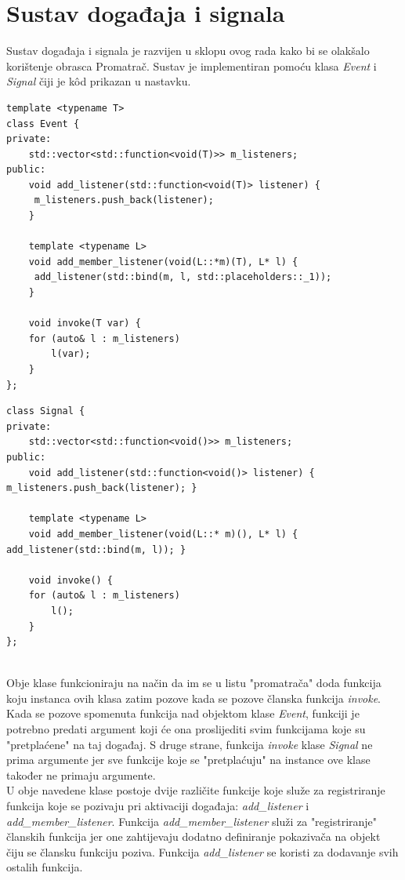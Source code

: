 \documentclass[times, utf8, diplomski]{fer}
\begin{document}
\chapter{Sustav događaja i signala} \label{appendix:event-signal-system}

Sustav događaja i signala je razvijen u sklopu ovog rada kako bi se olakšalo korištenje obrasca Promatrač. Sustav je implementiran pomoću klasa \textit{Event} i  \textit{Signal} čiji je k\^{o}d prikazan u nastavku.\\

\begin{lstlisting}[caption={Klasa \textit{Event}},captionpos=b]
template <typename T>
class Event {
private:
	std::vector<std::function<void(T)>> m_listeners;
public:
	void add_listener(std::function<void(T)> listener) {
	 m_listeners.push_back(listener); 
	}
	
	template <typename L>
	void add_member_listener(void(L::*m)(T), L* l) {
	 add_listener(std::bind(m, l, std::placeholders::_1)); 
	}
	
	void invoke(T var) {
	for (auto& l : m_listeners)
		l(var);
	}
};
\end{lstlisting}

\begin{lstlisting}[caption={Klasa \textit{Signal}},captionpos=b]
class Signal {
private:
	std::vector<std::function<void()>> m_listeners;
public:
	void add_listener(std::function<void()> listener) { m_listeners.push_back(listener); }

	template <typename L>
	void add_member_listener(void(L::* m)(), L* l) { add_listener(std::bind(m, l)); }

	void invoke() {
	for (auto& l : m_listeners)
		l();
	}
};
\end{lstlisting}
\
\\

Obje klase funkcioniraju na način da im se u listu "promatrača" doda funkcija koju instanca ovih klasa zatim pozove kada se pozove članska funkcija \textit{invoke}. Kada se pozove spomenuta funkcija nad objektom klase \textit{Event}, funkciji je potrebno predati argument koji će ona proslijediti svim funkcijama koje su "pretplaćene" na taj događaj. S druge strane, funkcija \textit{invoke} klase \textit{Signal} ne prima argumente jer sve funkcije koje se "pretplaćuju" na instance ove klase također ne primaju argumente.\\

U obje navedene klase postoje dvije različite funkcije koje služe za registriranje funkcija koje se pozivaju pri aktivaciji događaja: \textit{add\_listener} i \textit{add\_member\_listener}. Funkcija \textit{add\_member\_listener} služi za "registriranje" članskih funkcija jer one zahtijevaju dodatno definiranje pokazivača na objekt čiju se člansku funkciju poziva. Funkcija \textit{add\_listener} se koristi za dodavanje svih ostalih funkcija.
\end{document}
